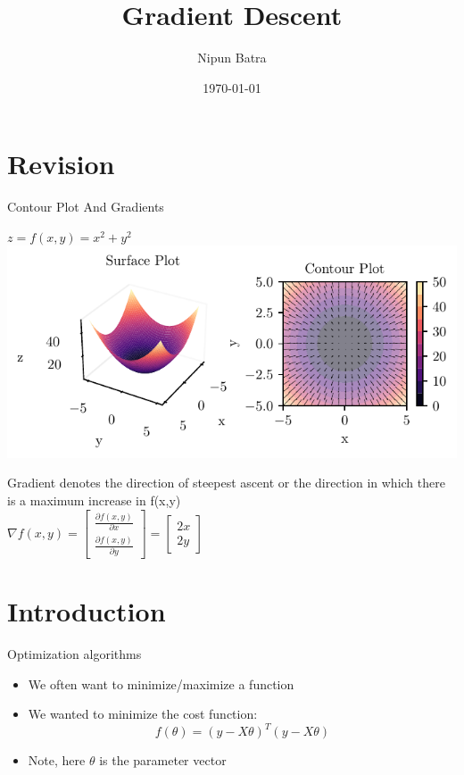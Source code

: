\documentclass[usenames,dvipsnames]{beamer}
\title{Gradient Descent}
\date{\today}
\author{Nipun Batra}
\institute{IIT Gandhinagar}
\begin{document}
  \maketitle

  \section{Revision}
  \begin{frame}{Contour Plot And Gradients}
	
	$z = f(x,y) = x^{2} + y^{2}$\\
	
	\includegraphics[scale=0.9]{../figures/mml/contour-x_squared_plus_y_squared_quiver-with-gradient.pdf}
	
	


\pause Gradient denotes the direction of steepest ascent or the direction in which there is a maximum increase in f(x,y) \\
\pause $\nabla f(x, y) = \begin{bmatrix}
\frac{\partial f(x, y)}{\partial x}\\
\frac{\partial f(x, y)}{\partial y}
\end{bmatrix} = \begin{bmatrix} 2x\\2y
\end{bmatrix}$



\end{frame}

  \section{Introduction}

  \begin{frame}{Optimization algorithms}
    \begin{itemize}[<+->]
        \item We often want to minimize/maximize a function
        \item We wanted to minimize the cost function:
        \begin{equation}
            f(\theta) = (y-X\theta)^T(y-X\theta)
        \end{equation}
        \item Note, here $\theta$ is the parameter vector
        \end{itemize}   
  \end{frame}
\end{document}
